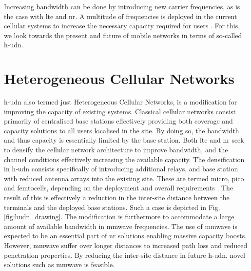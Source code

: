 Increasing bandwidth can be done by introducing new carrier frequencies, as is the case with \gls{lte} and \gls{nr}. A multitude of frequencies is deployed in the current cellular systems to increase the necessary capacity required for users \cite{Goldsmith2005WirelessCommunications, Molisch2007, Mogensen2007}. For this, we look towards the present and future of mobile networks in terms of so-called \gls{h-udn}.



\section{Heterogeneous Cellular Networks}
\gls{h-udn} also termed just Heterogeneous Cellular Networks, is a modification for improving the capacity of existing systems. Classical cellular networks consist primarily of centralised base stations effectively providing both coverage and capacity solutions to all users localised in the site. By doing so, the bandwidth and thus capacity is essentially limited by the base station. Both \gls{lte} and \gls{nr} seek to densify the cellular network architecture to improve bandwidth, and the channel conditions effectively increasing the available capacity. The densification in \gls{h-udn} consists specifically of introducing additional relays, and base station with reduced antenna arrays into the existing site. These are termed micro, pico and femtocells, depending on the deployment and overall requirements \cite{Yunas2015, Ge2016}. The result of this is effectively a reduction in the inter-site distance between the terminals and the deployed base stations. Such a case is depicted in Fig. \ref{fig:hudn_drawing}. The modification is furthermore to accommodate a large amount of available bandwidth in \gls{mmwave} frequencies. The use of \gls{mmwave} is expected to be an essential part of \gls{nr} solutions enabling massive capacity boosts. However, \gls{mmwave} suffer over longer distances to increased path loss and reduced penetration properties. By reducing the inter-site distance in future \gls{h-udn}, novel solutions such as \gls{mmwave} is feasible. 

